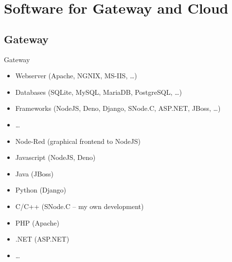 ﻿\section{Software for Gateway and Cloud}
\subsection{Gateway}

\begin{frame}{Gateway}
  \begin{description}[Languages]
    \item[Tools]
    \begin{itemize}
      \item Webserver (Apache, NGNIX, MS-IIS, \ldots)
      \item Databases (SQLite, MySQL, \alert<2>{MariaDB}, PostgreSQL, \ldots)
      \item Frameworks (\alert<2>{NodeJS}, Deno, Django, \alert<2>{SNode.C}, ASP.NET, JBoss, \ldots)
      \item \ldots
    \end{itemize}
    \item[Languages]
    \begin{itemize}
      \item \alert<2>{Node-Red (graphical frontend to NodeJS)}
      \item \alert<2>{Javascript} (\alert<2>{NodeJS}, Deno)
      \item Java (JBoss)
      \item Python (Django)
      \item \alert<2>{C/C++ (SNode.C -- my own development)}
      \item PHP (Apache)
      \item .NET (ASP.NET)
      \item \ldots
    \end{itemize}
  \end{description}
\end{frame}
